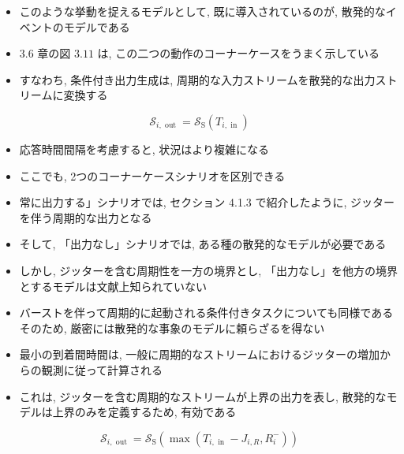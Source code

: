 \begin{frame}{}
    \begin{itemize}
        \item このような挙動を捉えるモデルとして, 既に導入されているのが, 散発的なイベントのモデルである
        \item $3.6$ 章の図 $3.11$ は, この二つの動作のコーナーケースをうまく示している
        \item すなわち, 条件付き出力生成は, 周期的な入力ストリームを散発的な出力ストリームに変換する

    \end{itemize}
    \begin{equation*}
        \mathcal{S}_{i, \text { out }}=\mathcal{S}_{\mathrm{S}}\left(T_{i, \text { in }}\right)
    \end{equation*}
\end{frame}

\begin{frame}{}
    \begin{itemize}
        \item 応答時間間隔を考慮すると, 状況はより複雑になる
        \item ここでも, 2つのコーナーケースシナリオを区別できる
        \item 常に出力する」シナリオでは, セクション 4.1.3 で紹介したように, ジッターを伴う周期的な出力となる
        \item そして, 「出力なし」シナリオでは, ある種の散発的なモデルが必要である
        \item しかし, ジッターを含む周期性を一方の境界とし, 「出力なし」を他方の境界とするモデルは文献上知られていない
        \item バーストを伴って周期的に起動される条件付きタスクについても同様であるそのため, 厳密には散発的な事象のモデルに頼らざるを得ない
        \item 最小の到着間時間は, 一般に周期的なストリームにおけるジッターの増加からの観測に従って計算される
        \item これは, ジッターを含む周期的なストリームが上界の出力を表し, 散発的なモデルは上界のみを定義するため, 有効である

    \end{itemize}
    \begin{equation*}
        \mathcal{S}_{i, \text { out }}=\mathcal{S}_{\mathrm{S}}\left(\max \left(T_{i, \text { in }}-J_{i, R}, R_{i}^{-}\right)\right)
    \end{equation*}
\end{frame}

